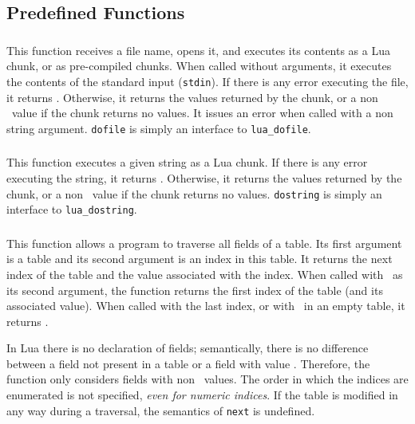 \subsection{Predefined Functions}

\subsubsection*{}
This function receives a file name,
opens it, and executes its contents as a Lua chunk,
or as pre-compiled chunks.
When called without arguments,
it executes the contents of the standard input (\verb'stdin').
If there is any error executing the file, it returns \nil.
Otherwise, it returns the values returned by the chunk,
or a non \nil\ value if the chunk returns no values.
It issues an error when called with a non string argument.
\verb|dofile| is simply an interface to \verb|lua_dofile|.

\subsubsection*{}
This function executes a given string as a Lua chunk.
If there is any error executing the string, it returns \nil.
Otherwise, it returns the values returned by the chunk,
or a non \nil\ value if the chunk returns no values.
\verb|dostring| is simply an interface to \verb|lua_dostring|.

\subsubsection*{}
This function allows a program to traverse all fields of a table.
Its first argument is a table and its second argument
is an index in this table.
It returns the next index of the table and the
value associated with the index.
When called with \nil\ as its second argument,
the function returns the first index
of the table (and its associated value).
When called with the last index, or with \nil\ in an empty table,
it returns \nil.

In Lua there is no declaration of fields;
semantically, there is no difference between a
field not present in a table or a field with value \nil.
Therefore, the function only considers fields with non \nil\ values.
The order in which the indices are enumerated is not specified,
{\em even for numeric indices}.
If the table is modified in any way during a traversal,
the semantics of \verb|next| is undefined.

